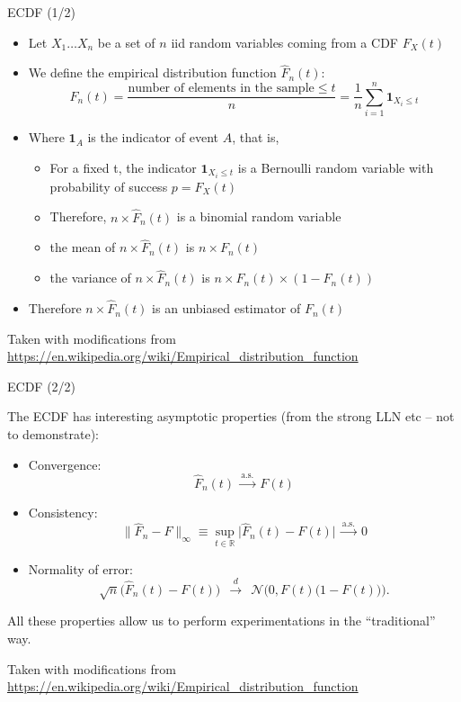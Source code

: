 \documentclass{beamer}
\begin{document}
\begin{frame}
{\centerline{ECDF (1/2)}}

\begin{itemize}
    \item Let $X_1 \ldots X_n$ be a set of $n$ iid random variables coming from a CDF $F_X(t)$
    \item We define the empirical distribution function $\widehat {F}_{n}(t)$: 
    $$ {\widehat {F}}_{n}(t)={\frac {{\mbox{number of elements in the sample}}\leq t}{n}}={\frac {1}{n}}\sum _{i=1}^{n}\mathbf {1} _{X_{i}\leq t}$$
    \item Where $\mathbf {1} _A$ is the indicator of event $A$, that is,
    \begin{itemize}
    \item  For a fixed t, the indicator $\mathbf {1} _{X_{i}\leq t}$ is a Bernoulli random variable with probability of success  $p=F_X(t)$
    \item Therefore, $n \times \widehat {F}_{n}(t)$ is a binomial random variable
    \item the mean of $n \times \widehat {F}_{n}(t)$ is $n \times F_{n}(t)$
    \item the variance of $n \times \widehat {F}_{n}(t)$ is $n \times F_{n}(t) \times (1- F_{n}(t))$
\end{itemize}
    \item Therefore $n \times \widehat {F}_{n}(t)$ is an unbiased estimator of $F_{n}(t)$
\end{itemize}

\begin{center}
\tiny{Taken with modifications from \url{https://en.wikipedia.org/wiki/Empirical_distribution_function}}
\end{center}

\end{frame}

\begin{frame}
{\centerline{ECDF (2/2)}}

The ECDF has interesting asymptotic properties (from the strong LLN etc -- not to demonstrate):
\begin{itemize}
\item Convergence:
$$ \widehat {F}_{n}(t)\ {\xrightarrow {\text{a.s.}}}\ F(t)$$
\item Consistency:
$$ \|{\widehat {F}}_{n}-F\|_{\infty }\equiv \sup _{t\in \mathbb {R} }{\big |}{\widehat {F}}_{n}(t)-F(t){\big |}\ {\xrightarrow {\text{a.s.}}}\ 0$$
\item Normality of error:
$${\sqrt {n}}{\big (}{\widehat {F}}_{n}(t)-F(t){\big )}\ \ {\xrightarrow {d}}\ \ {\mathcal {N}}{\Big (}0,F(t){\big (}1-F(t){\big )}{\Big )}.$$
\end{itemize}
All these properties allow us to perform experimentations in the ``traditional'' way.

\begin{center}
\tiny{Taken with modifications from \url{https://en.wikipedia.org/wiki/Empirical_distribution_function}}
\end{center}

\end{frame}
\end{document}
